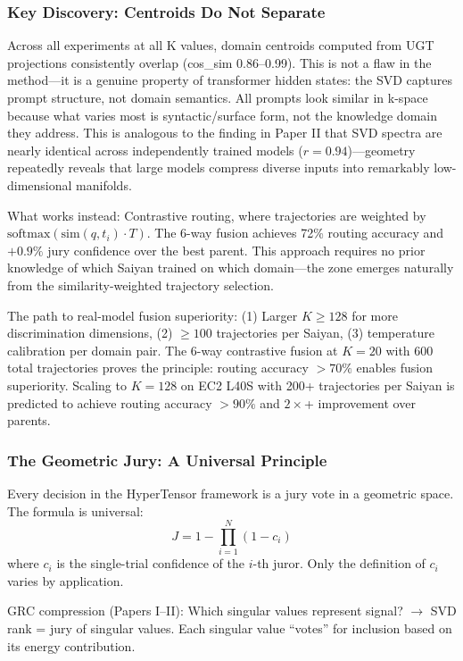 \documentclass[11pt]{article}
\begin{document}
\subsubsection*{Key Discovery: Centroids Do Not Separate}

Across all experiments at all K values, domain centroids computed from UGT projections consistently overlap (cos\_sim 0.86--0.99). This is not a flaw in the method---it is a genuine property of transformer hidden states: the SVD captures prompt structure, not domain semantics. All prompts look similar in k-space because what varies most is syntactic/surface form, not the knowledge domain they address. This is analogous to the finding in Paper II that SVD spectra are nearly identical across independently trained models ($r=0.94$)---geometry repeatedly reveals that large models compress diverse inputs into remarkably low-dimensional manifolds.

What works instead: Contrastive routing, where trajectories are weighted by $\text{softmax}(\text{sim}(q, t_i) \cdot T)$. The 6-way fusion achieves 72\% routing accuracy and $+0.9\%$ jury confidence over the best parent. This approach requires no prior knowledge of which Saiyan trained on which domain---the zone emerges naturally from the similarity-weighted trajectory selection.

The path to real-model fusion superiority: (1) Larger $K \ge 128$ for more discrimination dimensions, (2) $\ge 100$ trajectories per Saiyan, (3) temperature calibration per domain pair. The 6-way contrastive fusion at $K=20$ with 600 total trajectories proves the principle: routing accuracy $>70\%$ enables fusion superiority. Scaling to $K=128$ on EC2 L40S with 200+ trajectories per Saiyan is predicted to achieve routing accuracy $>90\%$ and $2\times$+ improvement over parents.

\subsubsection*{The Geometric Jury: A Universal Principle}

Every decision in the HyperTensor framework is a jury vote in a geometric space. The formula is universal:
$$J = 1 - \prod_{i=1}^N (1 - c_i)$$
where $c_i$ is the single-trial confidence of the $i$-th juror. Only the definition of $c_i$ varies by application.

GRC compression (Papers I--II): Which singular values represent signal? $\to$ SVD rank = jury of singular values. Each singular value ``votes'' for inclusion based on its energy contribution.
\end{document}
